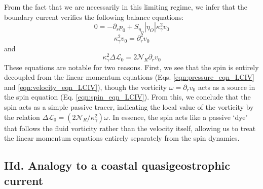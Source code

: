 \documentclass[%
 reprint,
superscriptaddress,
longbibliography,
 amsmath,amssymb,
 prl,
 citeautoscript,
]{revtex4-1}
\begin{document}
From the fact that we are necessarily in this limiting regime, we infer that the boundary current verifies the following balance equations:
\begin{equation}
0 = - \partial_r p_0 + S_{\eta_O} \left| \eta_O \right| \kappa_{\gamma}^2 v_0
\label{eqn:pressure_eqn_LCIV}
\end{equation}
\begin{equation}
\kappa_{\gamma}^2 v_0 = \partial_r^2 v_0
\label{eqn:velocity_eqn_LCIV}
\end{equation}
and
\begin{equation}
\kappa_{\gamma}^2 \Delta \mathcal{L}_0 = 2 \mathcal{N}_R \partial_r v_0
\label{eqn:spin_eqn_LCIV}
\end{equation}
These equations are notable for two reasons. First, we see that the spin is entirely decoupled from the linear momentum equations (Eqs. \ref{eqn:pressure_eqn_LCIV} and \ref{eqn:velocity_eqn_LCIV}), though the vorticity $\omega = \partial_r v_0$ acts as a source in the spin equation (Eq. \ref{eqn:spin_eqn_LCIV}). From this, we conclude that the spin acts as a simple passive tracer, indicating the local value of the vorticity by the relation $\Delta \mathcal{L}_0 = \left( 2 \mathcal{N}_R / \kappa_{\gamma}^2 \right) \omega$. In essence, the spin acts like a passive `dye' that follows the fluid vorticity rather than the velocity itself, allowing us to treat the linear momentum equations entirely separately from the spin dynamics.

\subsection{IId. Analogy to a coastal quasigeostrophic current}
\end{document}
